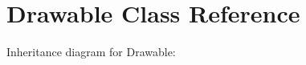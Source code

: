 \hypertarget{classDrawable}{}\section{Drawable Class Reference}
\label{classDrawable}


Inheritance diagram for Drawable\+:
